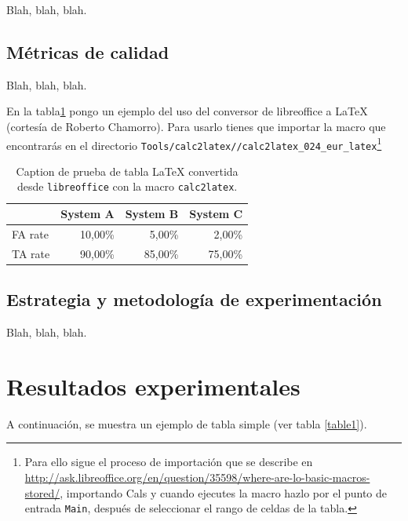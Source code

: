 \documentclass[spanish,openright]{book}
\begin{document}
Blah, blah, blah.


\subsection{Métricas de calidad}
\label{sec:metricas-de-calidad}

Blah, blah, blah.

En la tabla\ref{pruebaCalc2LaTeX} pongo un ejemplo del uso del conversor
de libreoffice a \LaTeX{} (cortesía de Roberto Chamorro). Para usarlo
tienes que importar la macro que encontrarás en el directorio
\texttt{Tools/calc2latex//calc2latex\_024\_eur\_latex}\footnote{Para
  ello sigue el proceso de importación que se describe en
  \url{http://ask.libreoffice.org/en/question/35598/where-are-lo-basic-macros-stored/},
  importando Cals
  y cuando ejecutes la macro hazlo por el punto de entrada
  \texttt{Main}, después de seleccionar el rango de celdas de la tabla.}

\begin{table}[htbp]
\caption{Caption de prueba de tabla LaTeX convertida desde
  \texttt{libreoffice} con la macro \texttt{calc2latex}.}
\begin{center}
\begin{tabular}{|l|r|r|r|}
\hline
 & \multicolumn{1}{l|}{System A} & \multicolumn{1}{l|}{System B} & \multicolumn{1}{l|}{System C} \\ \hline
FA rate & 10,00\% & 5,00\% & 2,00\% \\ \hline
TA rate & 90,00\% & 85,00\% & 75,00\% \\ \hline
\end{tabular}
\end{center}
\label{pruebaCalc2LaTeX}
\end{table}

 

\subsection{Estrategia y metodología de experimentación}
\label{sec:estr-y-metod}

Blah, blah, blah.


\section{Resultados experimentales}
\label{sec:result-experim}

A continuación, se muestra un ejemplo de tabla simple (ver tabla \ref{table1}).
\end{document}
